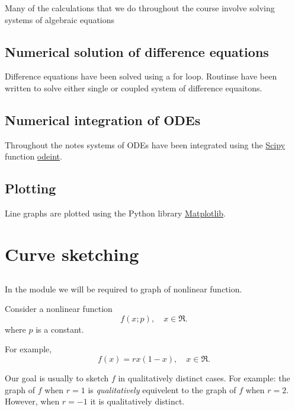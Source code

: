 \documentclass[
  letterpaper,
  DIV=11,
  numbers=noendperiod]{scrreprt}
\begin{document}
Many of the calculations that we do throughout the course involve
solving systems of algebraic equations

\section{Numerical solution of difference
equations}\label{numerical-solution-of-difference-equations}

Difference equations have been solved using a for loop. Routinse have
been written to solve either single or coupled system of difference
equaitons.

\section{Numerical integration of
ODEs}\label{numerical-integration-of-odes}

Throughout the notes systems of ODEs have been integrated using the
\href{https://scipython.com}{Scipy} function
\href{https://docs.scipy.org/doc/scipy/reference/generated/scipy.integrate.odeint.html}{odeint}.

\section{Plotting}\label{plotting}

Line graphs are plotted using the Python library
\href{https://matplotlib.org}{Matplotlib}.

\chapter{Curve sketching}\label{curve-sketching}

\section{}\label{section}

In the module we will be required to graph of nonlinear function.

Consider a nonlinear function \[
f(x;p), \quad x \in \Re.
\] where \(p\) is a constant.

For example, \[
f(x)=rx(1-x), \quad x \in \Re.
\]

Our goal is usually to sketch \(f\) in qualitatively distinct cases. For
example: the graph of \(f\) when \(r=1\) is \emph{qualitatively}
equivelent to the graph of \(f\) when \(r=2\). However, when \(r=-1\) it
is qualitatively distinct.
\end{document}
